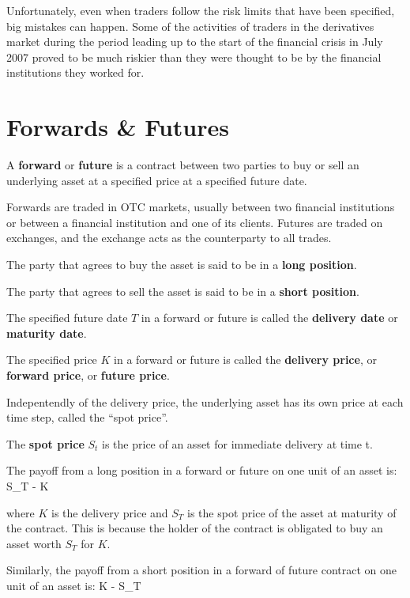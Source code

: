 Unfortunately, even when traders follow the risk limits that have been specified, big mistakes can happen. Some of
the activities of traders in the derivatives market during the period leading up to the start of the financial crisis
in July 2007 proved to be much riskier than they were thought to be by the financial institutions they worked for.

\section{Forwards \& Futures}

A \textbf{forward} or \textbf{future} is a contract between two parties to buy or sell an underlying asset at a
specified price at a specified future date.
\ed

Forwards are traded in OTC markets, usually between two financial institutions or between a financial institution and
one of its clients. Futures are traded on exchanges, and the exchange acts as the counterparty to all trades.

The party that agrees to buy the asset is said to be in a \textbf{long position}.
\ed

The party that agrees to sell the asset is said to be in a \textbf{short position}.
\ed

The specified future date $T$ in a forward or future is called the \textbf{delivery date} or \textbf{maturity date}.
\ed

The specified price $K$ in a forward or future is called the \textbf{delivery price}, or \textbf{forward price}, or
\textbf{future price}.
\ed

Indepentendly of the delivery price, the underlying asset has its own price at each time step, called the ``spot
price''.

The \textbf{spot price} $S_t$ is the price of an asset for immediate delivery at time t.
\ed

The payoff from a long position in a forward or future on one unit of an asset is:
\bse
S_T - K
\ese

where $K$ is the delivery price and $S_T$ is the spot price of the asset at maturity of the contract. This is because
the holder of the contract is obligated to buy an asset worth $S_T$ for $K$.

Similarly, the payoff from a short position in a forward of future contract on one unit of an asset is:
\bse
K - S_T
\ese

